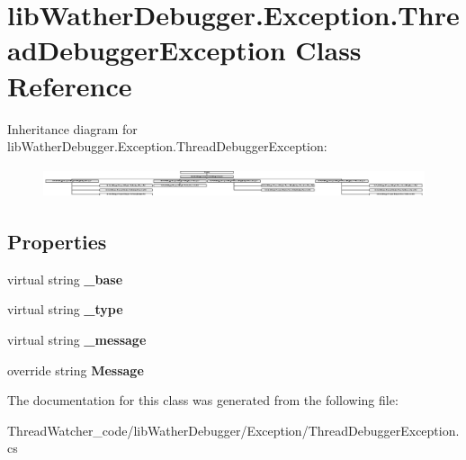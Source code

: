 \hypertarget{classlib_wather_debugger_1_1_exception_1_1_thread_debugger_exception}{\section{lib\+Wather\+Debugger.\+Exception.\+Thread\+Debugger\+Exception Class Reference}
\label{classlib_wather_debugger_1_1_exception_1_1_thread_debugger_exception}
}
Inheritance diagram for lib\+Wather\+Debugger.\+Exception.\+Thread\+Debugger\+Exception\+:\begin{figure}[H]
\begin{center}
\leavevmode
\includegraphics[height=0.883978cm]{classlib_wather_debugger_1_1_exception_1_1_thread_debugger_exception}
\end{center}
\end{figure}
\subsection*{Properties}
\begin{DoxyCompactItemize}
\item 
\hypertarget{classlib_wather_debugger_1_1_exception_1_1_thread_debugger_exception_a8615ccf8b13c6fcadfc539d812bfe336}{virtual string {\bfseries \+\_\+base}}\label{classlib_wather_debugger_1_1_exception_1_1_thread_debugger_exception_a8615ccf8b13c6fcadfc539d812bfe336}

\item 
\hypertarget{classlib_wather_debugger_1_1_exception_1_1_thread_debugger_exception_afe9078837d8e6c06fb93049ffc132cd2}{virtual string {\bfseries \+\_\+type}}\label{classlib_wather_debugger_1_1_exception_1_1_thread_debugger_exception_afe9078837d8e6c06fb93049ffc132cd2}

\item 
\hypertarget{classlib_wather_debugger_1_1_exception_1_1_thread_debugger_exception_a3384ac32809f7a68d0b7e53c1432ad37}{virtual string {\bfseries \+\_\+message}}\label{classlib_wather_debugger_1_1_exception_1_1_thread_debugger_exception_a3384ac32809f7a68d0b7e53c1432ad37}

\item 
\hypertarget{classlib_wather_debugger_1_1_exception_1_1_thread_debugger_exception_ab7226341c1ee3504c1b39a3beb4a46c2}{override string {\bfseries Message}}\label{classlib_wather_debugger_1_1_exception_1_1_thread_debugger_exception_ab7226341c1ee3504c1b39a3beb4a46c2}

\end{DoxyCompactItemize}


The documentation for this class was generated from the following file\+:\begin{DoxyCompactItemize}
\item 
Thread\+Watcher\+\_\+code/lib\+Wather\+Debugger/\+Exception/Thread\+Debugger\+Exception.\+cs\end{DoxyCompactItemize}
